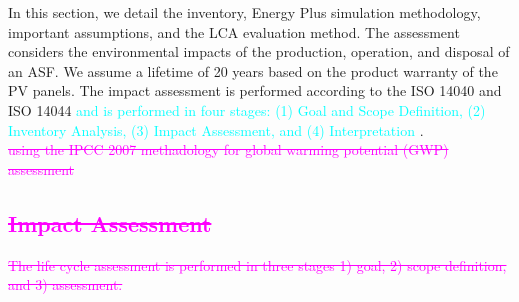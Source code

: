 
In this section, we detail the inventory, Energy Plus simulation methodology, important assumptions, and the LCA evaluation method. The assessment considers the environmental impacts of the production, operation, and disposal of an ASF. We assume a lifetime of 20 years based on the product warranty of the PV panels. The impact assessment is performed according to the ISO 14040 and ISO 14044 \textcolor{cyan}{and is performed in four stages: (1) Goal and Scope Definition, (2) Inventory Analysis, (3) Impact Assessment, and (4) Interpretation} \cite{finkbeiner2006new}.\\\textcolor{magenta}{\sout{using the IPCC 2007 methadology for global warming potential (GWP) assessment}}


\subsection{\textcolor{magenta}{\sout{ Impact Assessment}}}
\textcolor{magenta}{\sout{The life cycle assessment is performed in three stages 1) goal, 2) scope definition, and 3) assessment.}}

